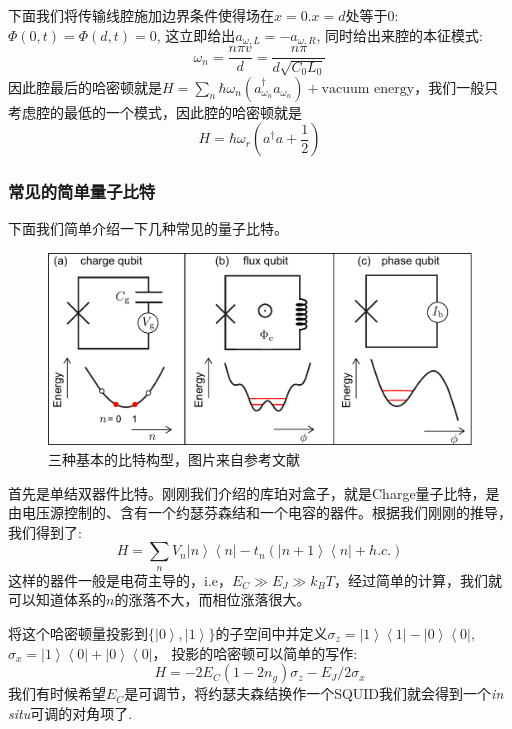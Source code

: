 \documentclass[supercite]{HustGraduPaper}
\newcommand{\bra}[1]{\left\langle #1 \right|}
\newcommand{\ket}[1]{\left| #1 \right\rangle}
\begin{document}
下面我们将传输线腔施加边界条件使得场在$x = 0. x=d$处等于0: $\Phi(0,t) = \Phi(d,t) = 0$, 这立即给出$a_{\omega, L} = -a_{\omega,R}$, 同时给出来腔的本征模式:
\begin{equation}
\omega_n  = \frac{n \pi v}{d} = \frac{n \pi }{d \sqrt{C_0 L_0}}
\end{equation}
因此腔最后的哈密顿就是$H = \sum_{n} \hbar \omega_n (a^\dagger_{\omega_n} a_{\omega_n}) + \text{vacuum energy}$，我们一般只考虑腔的最低的一个模式，因此腔的哈密顿就是
\begin{equation}
H = \hbar \omega_r (a^\dagger a + \frac{1}{2})
\end{equation}
      \subsubsection{常见的简单量子比特}
      下面我们简单介绍一下几种常见的量子比特\cite{girvin2009circuit,martinis2009superconducting}。
      
      \begin{figure}
      	\centering
      	\includegraphics[width=0.9\linewidth]{Figures/review/ThreeQubits}
      	\caption{三种基本的比特构型，图片来自参考文献\cite{GU20171}}
      	\label{fig:threequbits}
      \end{figure}
      
      首先是单结双器件比特。刚刚我们介绍的库珀对盒子，就是Charge量子比特，是由电压源控制的、含有一个约瑟芬森结和一个电容的器件\cite{astafiev2004quantum}。根据我们刚刚的推导，我们得到了: 
      \begin{equation}
      H = \sum_n V_n \ket{n} \bra{n} - t_n (\ket{n+1}\bra{n} + h.c.)
      \end{equation}
      这样的器件一般是电荷主导的，i.e，$E_C \gg E_J \gg k_B T$，经过简单的计算，我们就可以知道体系的$n$的涨落不大，而相位涨落很大。
      
      将这个哈密顿量投影到$\{\ket{0}, \ket{1}\}$的子空间中并定义$\sigma_z = \ket{1}\bra{1} - \ket{0}\bra{0}$, $\sigma_x = \ket{1}\bra{0} + \ket{0}\bra{0}$， 投影的哈密顿可以简单的写作:
      \begin{equation}
      H = -2E_C(1-2n_g)\sigma_z - E_J/2 \sigma_x
      \end{equation}
      我们有时候希望$E_C$是可调节，将约瑟夫森结换作一个SQUID我们就会得到一个\textit{in situ}可调的对角项了. 
      
\end{document}
